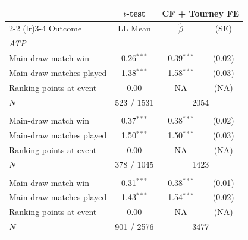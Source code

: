 \begin{tabular}{l ccc}
\toprule
 & $t$-test & \multicolumn{2}{c}{CF + Tourney FE} \\
\cmidrule(lr){2-2} \cmidrule(lr){3-4}
Outcome & LL Mean & $\hat{\beta}$ & (SE) \\
\midrule
\multicolumn{4}{l}{\textit{ATP}} \\
\quad Main-draw match win & 0.26$^{***}$ & 0.39$^{***}$ & (0.02) \\
\quad Main-draw matches played & 1.38$^{***}$ & 1.58$^{***}$ & (0.03) \\
\quad Ranking points at event & 0.00 & NA & (NA) \\
\quad $N$ & \multicolumn{1}{c}{523 / 1531} & \multicolumn{2}{c}{2054} \\
\addlinespace
\multicolumn{4}{l}{\textit{WTA}} \\
\quad Main-draw match win & 0.37$^{***}$ & 0.38$^{***}$ & (0.02) \\
\quad Main-draw matches played & 1.50$^{***}$ & 1.50$^{***}$ & (0.03) \\
\quad Ranking points at event & 0.00 & NA & (NA) \\
\quad $N$ & \multicolumn{1}{c}{378 / 1045} & \multicolumn{2}{c}{1423} \\
\addlinespace
\multicolumn{4}{l}{\textit{Pooled}} \\
\quad Main-draw match win & 0.31$^{***}$ & 0.38$^{***}$ & (0.01) \\
\quad Main-draw matches played & 1.43$^{***}$ & 1.54$^{***}$ & (0.02) \\
\quad Ranking points at event & 0.00 & NA & (NA) \\
\quad $N$ & \multicolumn{1}{c}{901 / 2576} & \multicolumn{2}{c}{3477} \\
\bottomrule
\end{tabular}
